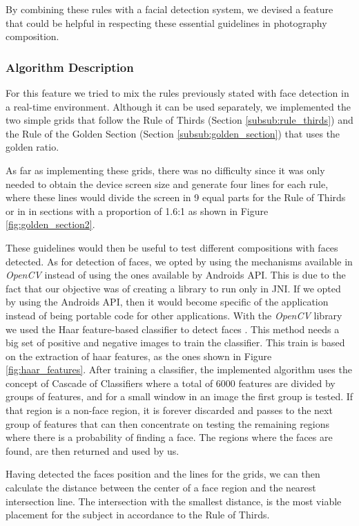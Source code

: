 By combining these rules with a facial detection system, we devised a feature that could be helpful in respecting these essential guidelines in photography composition.

\subsubsection{Algorithm Description}

For this feature we tried to mix the rules previously stated with face detection in a real-time environment. Although it can be used separately, we implemented the two simple grids that follow the Rule of Thirds (Section \ref{subsub:rule_thirds}) and the Rule of the Golden Section (Section \ref{subsub:golden_section}) that uses the golden ratio.

As far as implementing these grids, there was no difficulty since it was only needed to obtain the device screen size and generate four lines for each rule, where these lines would divide the screen in 9 equal parts for the Rule of Thirds or in in sections with a proportion of 1.6:1 as shown in Figure \ref{fig:golden_section2}.

These guidelines would then be useful to test different compositions with faces detected. As for detection of faces, we opted by using the mechanisms available in \emph{OpenCV} instead of using the ones available by Androids API. This is due to the fact that our objective was of creating a library to run only in JNI. If we opted by using the Androids API, then it would become specific of the application instead of being portable code for other applications.
With the \emph{OpenCV} library we used the Haar feature-based classifier to detect faces \cite{viola2001rapid}. This method needs a big set of positive and negative images to train the classifier. This train is based on the extraction of haar features, as the ones shown in Figure \ref{fig:haar_features}. After training a classifier, the implemented algorithm uses the concept of Cascade of Classifiers where a total of 6000 features are divided by groups of features, and for a small window in an image the first group is tested. If that region is a non-face region, it is forever discarded and passes to the next group of features that can then concentrate on testing the remaining regions where there is a probability of finding a face. The regions where the faces are found, are then returned and used by us.

Having detected the faces position and the lines for the grids, we can then calculate the distance between the center of a face region and the nearest intersection line. The intersection with the smallest distance, is the most viable placement for the subject in accordance to the Rule of Thirds.

